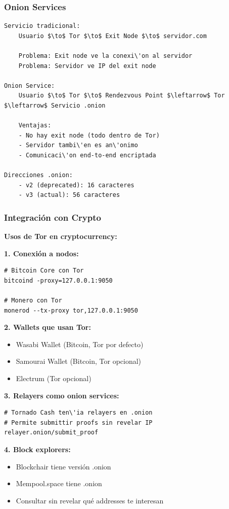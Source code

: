 \documentclass[11pt,a4paper,twoside]{book}
\begin{document}
\subsubsection{Onion Services}

\begin{example}
\begin{verbatim}
Servicio tradicional:
    Usuario $\to$ Tor $\to$ Exit Node $\to$ servidor.com
    
    Problema: Exit node ve la conexi\'on al servidor
    Problema: Servidor ve IP del exit node

Onion Service:
    Usuario $\to$ Tor $\to$ Rendezvous Point $\leftarrow$ Tor $\leftarrow$ Servicio .onion
    
    Ventajas:
    - No hay exit node (todo dentro de Tor)
    - Servidor tambi\'en es an\'onimo
    - Comunicaci\'on end-to-end encriptada
    
Direcciones .onion:
    - v2 (deprecated): 16 caracteres
    - v3 (actual): 56 caracteres
\end{verbatim}
\end{example}

\subsubsection{Integraci\'on con Crypto}

\begin{remark}
\textbf{Usos de Tor en cryptocurrency:}

\textbf{1. Conexi\'on a nodos:}
\begin{verbatim}
# Bitcoin Core con Tor
bitcoind -proxy=127.0.0.1:9050

# Monero con Tor
monerod --tx-proxy tor,127.0.0.1:9050
\end{verbatim}

\textbf{2. Wallets que usan Tor:}
\begin{itemize}
    \item Wasabi Wallet (Bitcoin, Tor por defecto)
    \item Samourai Wallet (Bitcoin, Tor opcional)
    \item Electrum (Tor opcional)
\end{itemize}

\textbf{3. Relayers como onion services:}
\begin{verbatim}
# Tornado Cash ten\'ia relayers en .onion
# Permite submittir proofs sin revelar IP
relayer.onion/submit_proof
\end{verbatim}

\textbf{4. Block explorers:}
\begin{itemize}
    \item Blockchair tiene versi\'on .onion
    \item Mempool.space tiene .onion
    \item Consultar sin revelar qu\'e addresses te interesan
\end{itemize}
\end{remark}
\end{document}

